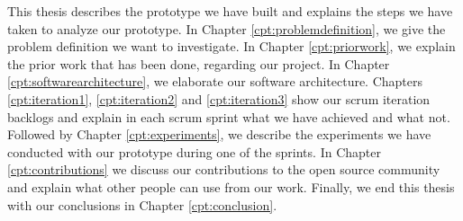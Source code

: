 This thesis describes the prototype we have built and explains the steps we have taken to analyze our prototype. In Chapter \ref{cpt:problemdefinition}, we give the problem definition we want to investigate. In Chapter \ref{cpt:priorwork}, we explain the prior work that has been done, regarding our project. In Chapter \ref{cpt:softwarearchitecture}, we elaborate our software architecture. Chapters \ref{cpt:iteration1}, \ref{cpt:iteration2} and \ref{cpt:iteration3} show our scrum iteration backlogs and explain in each scrum sprint what we have achieved and what not. Followed by Chapter \ref{cpt:experiments}, we describe the experiments we have conducted with our prototype during one of the sprints. In Chapter \ref{cpt:contributions} we discuss our contributions to the open source community and explain what other people can use from our work. Finally, we end this thesis with our conclusions in Chapter \ref{cpt:conclusion}.
